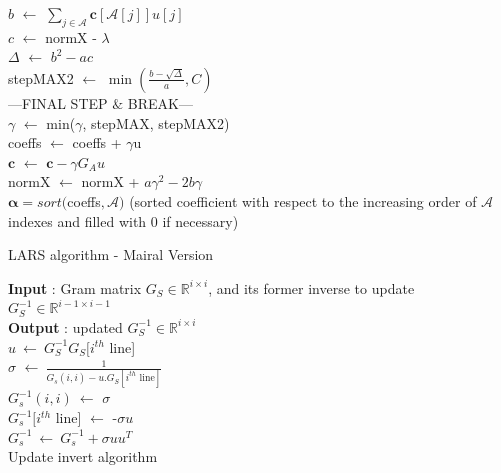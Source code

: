 \documentclass{ipol}
\newcommand{\code}{\bm{\alpha}}
\newcommand{\clars}{\textbf{c}}
\newcommand{\A}{\mathcal{A}}
\begin{document}
\begin{algorithm}[H]
{	$b$ $\leftarrow$ $\sum_{j \in \A} \clars[\A[j]] u[j]$\\
	$c$ $\leftarrow$ normX - $\lambda$\\
	$\Delta$ $\leftarrow$ $b^2 - ac$ \\
	stepMAX2 $\leftarrow$ $\min(\frac{b - \sqrt{\Delta}}{a}, C)$ \\
	---FINAL STEP $\&$ BREAK---\\
	$\gamma$ $\leftarrow$ min($\gamma$, stepMAX, stepMAX2)\\
	coeffs $\leftarrow$ coeffs + $\gamma$u \\
	$\clars$ $\leftarrow$ $\clars - \gamma G_Au$ \\
	normX $\leftarrow$ normX + $a\gamma^2 - 2b\gamma$ \\
}
\Return $\code = sort($coeffs$, \A)$ (sorted coefficient with respect to the increasing order of $\A$ indexes and filled with 0 if necessary)
	
\caption{LARS algorithm - Mairal Version}

\end{algorithm}

\newpage

\begin{algorithm}[H]

\SetLine
\textbf{Input} : Gram matrix $G_S \in \mathbb{R}^{i \times i}$, and its former inverse to update $G_S^{-1}\in \mathbb{R}^{i-1 \times i-1}$\\
\textbf{Output} : updated  $G_S^{-1}\in \mathbb{R}^{i \times i}$\\
$u \ \leftarrow \ G_S^{-1} G_S[i^{th}$ line]\\
$\sigma$ $\leftarrow \ \frac{1}{G_s(i,i) - u.G_S[i^{th} \text{ line}]}$\\
$G_s^{-1}(i,i)\ \leftarrow$ $\sigma$\\
$G_s^{-1}[i^{th}$ line] $\leftarrow$ -$\sigma u$\\
\Return $G_s^{-1} \ \leftarrow \ G_s^{-1}+\sigma u u^T$\\
\caption{Update invert algorithm}

\end{algorithm}
\end{document}
